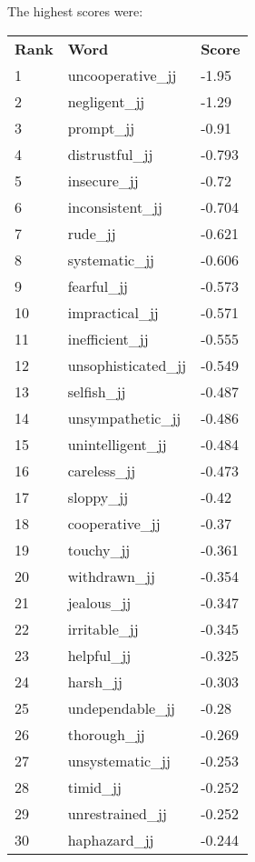 \documentclass[10pt,letterpaper]{book}
\begin{document}
The highest scores were:
\begin{tabular}{ l l l }
        \textbf{Rank} & \textbf{Word} & \textbf{Score} \\
        1 & uncooperative\_jj & -1.95 \\
        2 & negligent\_jj & -1.29 \\
        3 & prompt\_jj & -0.91 \\
        4 & distrustful\_jj & -0.793 \\
        5 & insecure\_jj & -0.72 \\
        6 & inconsistent\_jj & -0.704 \\
        7 & rude\_jj & -0.621 \\
        8 & systematic\_jj & -0.606 \\
        9 & fearful\_jj & -0.573 \\
        10 & impractical\_jj & -0.571 \\
        11 & inefficient\_jj & -0.555 \\
        12 & unsophisticated\_jj & -0.549 \\
        13 & selfish\_jj & -0.487 \\
        14 & unsympathetic\_jj & -0.486 \\
        15 & unintelligent\_jj & -0.484 \\
        16 & careless\_jj & -0.473 \\
        17 & sloppy\_jj & -0.42 \\
        18 & cooperative\_jj & -0.37 \\
        19 & touchy\_jj & -0.361 \\
        20 & withdrawn\_jj & -0.354 \\
        21 & jealous\_jj & -0.347 \\
        22 & irritable\_jj & -0.345 \\
        23 & helpful\_jj & -0.325 \\
        24 & harsh\_jj & -0.303 \\
        25 & undependable\_jj & -0.28 \\
        26 & thorough\_jj & -0.269 \\
        27 & unsystematic\_jj & -0.253 \\
        28 & timid\_jj & -0.252 \\
        29 & unrestrained\_jj & -0.252 \\
        30 & haphazard\_jj & -0.244 \\
\end{tabular}
\end{document}
